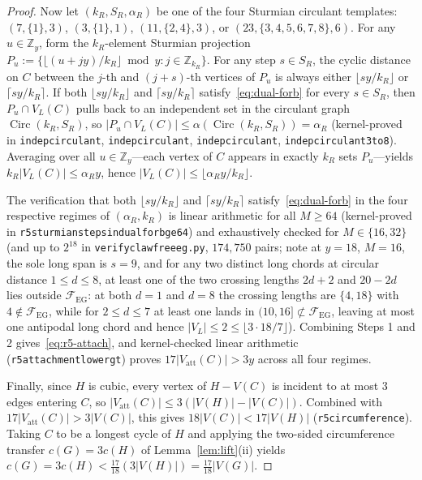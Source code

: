 \documentclass[11pt,reqno]{amsart}
\theoremstyle{plain}
\theoremstyle{definition}
\theoremstyle{remark}
\newcommand{\FEG}{\mathcal{F}_{\mathrm{EG}}}
\newcommand{\Vatt}{V_{\mathrm{att}}}
\DeclareRobustCommand{\_}{\ifmmode\text{\textunderscore}\else\textunderscore\allowbreak\fi}
\begin{document}
\begin{proof}
Now let $(k_R, S_R, \alpha_R)$ be one of the four Sturmian circulant templates:
$(7, \{1\}, 3)$, $(3, \{1\}, 1)$, $(11, \{2, 4\}, 3)$, or $(23, \{3, 4, 5, 6, 7, 8\}, 6)$.
For any $u \in \mathbb{Z}_y$, form the $k_R$-element Sturmian projection $P_u := \bigl\{ \lfloor (u + j y)/k_R \rfloor \bmod y : j \in \mathbb{Z}_{k_R} \bigr\}$. For any step $s \in S_R$, the cyclic distance on $C$ between the $j$-th and $(j+s)$-th vertices of $P_u$ is always either $\lfloor s y / k_R \rfloor$ or $\lceil s y / k_R \rceil$. If both $\lfloor s y / k_R \rfloor$ and $\lceil s y / k_R \rceil$ satisfy~\eqref{eq:dual-forb} for every $s \in S_R$, then $P_u \cap V_L(C)$ pulls back to an independent set in the circulant graph $\operatorname{Circ}(k_R, S_R)$, so $|P_u \cap V_L(C)| \le \alpha(\operatorname{Circ}(k_R, S_R)) = \alpha_R$ (kernel-proved in \texttt{indep\_circulant\_7\_1}, \texttt{indep\_circulant\_3\_1}, \texttt{indep\_circulant\_11\_24}, \texttt{indep\_circulant\_23\_3to8}). Averaging over all $u \in \mathbb{Z}_y$---each vertex of $C$ appears in exactly $k_R$ sets $P_u$---yields $k_R |V_L(C)| \le \alpha_R y$, hence $|V_L(C)| \le \lfloor \alpha_R y / k_R \rfloor$.

The verification that both $\lfloor s y / k_R \rfloor$ and $\lceil s y / k_R \rceil$ satisfy~\eqref{eq:dual-forb} in the four respective regimes of $(\alpha_R, k_R)$ is linear arithmetic for all $M \ge 64$ (kernel-proved in \texttt{r5\_sturmian\_steps\_in\_dual\_forb\_ge64}) and exhaustively checked for $M \in \{16, 32\}$ (and up to $2^{18}$ in \texttt{verify\_clawfree\_eg.py}, $174{,}750$ pairs; note at $y = 18$, $M = 16$, the sole long span is $s = 9$, and for any two distinct long chords at circular distance $1 \le d \le 8$, at least one of the two crossing lengths $2d + 2$ and $20 - 2d$ lies outside $\FEG$: at both $d = 1$ and $d = 8$ the crossing lengths are $\{4, 18\}$ with $4 \notin \FEG$, while for $2 \le d \le 7$ at least one lands in $(10, 16] \not\subset \FEG$, leaving at most one antipodal long chord and hence $|V_L| \le 2 \le \lfloor 3 \cdot 18 / 7 \rfloor$). Combining Steps 1 and 2 gives~\eqref{eq:r5-attach}, and kernel-checked linear arithmetic (\texttt{r5\_attachment\_lower\_gt\_3\_17}) proves $17 |\Vatt(C)| > 3 y$ across all four regimes.

Finally, since $H$ is cubic, every vertex of $H - V(C)$ is incident to at most $3$ edges entering $C$, so $|\Vatt(C)| \le 3(|V(H)| - |V(C)|)$. Combined with $17 |\Vatt(C)| > 3 |V(C)|$, this gives $18 |V(C)| < 17 |V(H)|$ (\texttt{r5\_circumference\_17\_18}). Taking $C$ to be a longest cycle of $H$ and applying the two-sided circumference transfer $c(G) = 3 c(H)$ of Lemma~\ref{lem:lift}(ii) yields $c(G) = 3 c(H) < \frac{17}{18}(3|V(H)|) = \frac{17}{18}|V(G)|$.


\end{proof}
\end{document}
